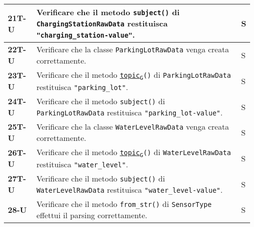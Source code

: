 \begin{longtable}{|>{\raggedright\arraybackslash}m{}|>{\raggedright\arraybackslash}m{}|>{\raggedright\arraybackslash}m{}|}
	\hline
	\textbf{21T-U}  & Verificare che il metodo \texttt{subject()} di \texttt{ChargingStationRawData} restituisca \texttt{"charging\_station-value"}.                                                                                                                   & S              \\
	\hline
	\textbf{22T-U}  & Verificare che la classe \texttt{ParkingLotRawData} venga creata correttamente.                                                                                                                                                                  & S              \\
	\hline
	\textbf{23T-U}  & Verificare che il metodo \texttt{\href{https://7last.github.io/docs/rtb/documentazione-interna/glossario\#topic}{topic\textsubscript{G}}()} di \texttt{ParkingLotRawData} restituisca \texttt{"parking\_lot"}.                                   & S              \\
	\hline
	\textbf{24T-U}  & Verificare che il metodo \texttt{subject()} di \texttt{ParkingLotRawData} restituisca \texttt{"parking\_lot-value"}.                                                                                                                             & S              \\
	\hline
	\textbf{25T-U}  & Verificare che la classe \texttt{WaterLevelRawData} venga creata correttamente.                                                                                                                                                                  & S              \\
	\hline
	\textbf{26T-U}  & Verificare che il metodo \texttt{\href{https://7last.github.io/docs/rtb/documentazione-interna/glossario\#topic}{topic\textsubscript{G}}()} di \texttt{WaterLevelRawData} restituisca \texttt{"water\_level"}.                                   & S              \\
	\hline
	\textbf{27T-U}  & Verificare che il metodo \texttt{subject()} di \texttt{WaterLevelRawData} restituisca \texttt{"water\_level-value"}.                                                                                                                             & S              \\
	\hline
	\textbf{28-U}   & Verificare che il metodo \texttt{from\_str()} di \texttt{SensorType} effettui il parsing correttamente.                                                                                                                                          & S              \\

\end{longtable}
